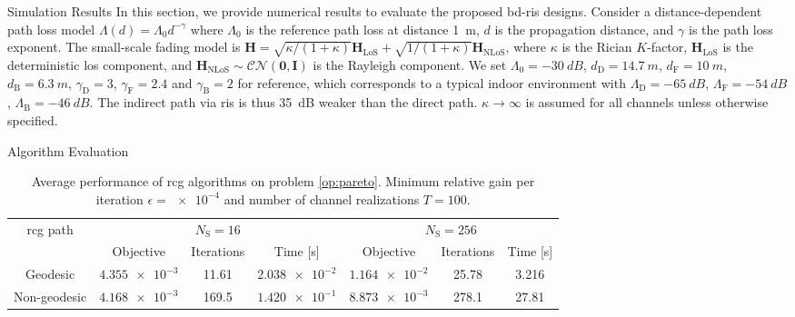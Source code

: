 \begin{section}{Simulation Results}\label{sc:simulation}
	In this section, we provide numerical results to evaluate the proposed \gls{bd}-\gls{ris} designs.
	Consider a distance-dependent path loss model $\Lambda(d) = \Lambda_0 d^{-\gamma}$ where $\Lambda_0$ is the reference path loss at distance \qty{1}{m}, $d$ is the propagation distance, and $\gamma$ is the path loss exponent.
	The small-scale fading model is $\mathbf{H} = \sqrt{\kappa/(1+\kappa)} \mathbf{H}_\text{LoS} + \sqrt{1/(1+\kappa)} \mathbf{H}_\text{NLoS}$, where $\kappa$ is the Rician $K$-factor, $\mathbf{H}_\text{LoS}$ is the deterministic \gls{los} component, and $\mathbf{H}_\text{NLoS} \sim \mathcal{CN}(\mathbf{0}, \mathbf{I})$ is the Rayleigh component.
	We set $\Lambda_0=\qty{-30}{dB}$, $d_\mathrm{D}=\qty{14.7}{m}$, $d_\mathrm{F}=\qty{10}{m}$, $d_\mathrm{B}=\qty{6.3}{m}$, $\gamma_\mathrm{D}=3$, $\gamma_\mathrm{F}=2.4$ and $\gamma_\mathrm{B}=2$ for reference, which corresponds to a typical indoor environment with $\Lambda_\mathrm{D}=\qty{-65}{dB}$, $\Lambda_\mathrm{F}=\qty{-54}{dB}$, $\Lambda_\mathrm{B}=\qty{-46}{dB}$.
	The indirect path via \gls{ris} is thus \qty{35}{\dB} weaker than the direct path.
	$\kappa \to \infty$ is assumed for all channels unless otherwise specified.

	\begin{subsection}{Algorithm Evaluation}
		\begin{table}[H]
			\footnotesize
			\caption{Average performance of \gls{rcg} algorithms on problem \eqref{op:pareto}. Minimum relative gain per iteration $\epsilon=\num{e-4}$ and number of channel realizations $T=100$.}
			\label{tb:complexity_test}
			\centering
			\begin{tabular}{ccccccc}
				\toprule
				\multirow{2}{*}{\gls{rcg} path} & \multicolumn{3}{c}{$N_\mathrm{S}=16$} & \multicolumn{3}{c}{$N_\mathrm{S}=256$}                                                                 \\ \cmidrule(lr){2-4} \cmidrule(lr){5-7}
												& Objective                              & Iterations                             & Time [s]         & Objective        & Iterations & Time [s]  \\ \midrule
				Geodesic                        & $\num{4.355e-3}$                       & 11.61                                  & $\num{2.038e-2}$ & $\num{1.164e-2}$ & 25.78      & 3.216     \\
				Non-geodesic                    & $\num{4.168e-3}$                       & 169.5                                  & $\num{1.420e-1}$ & $\num{8.873e-3}$ & 278.1      & 27.81     \\ \bottomrule
			\end{tabular}
		\end{table}


\end{subsection}
\end{section}

